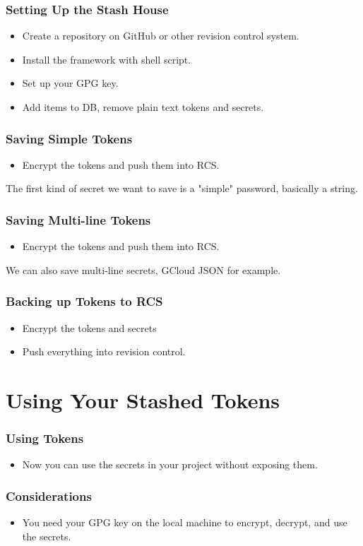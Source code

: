 \documentclass[aspectratio=169]{beamer}
\makeatletter
\def\sectionsubtitle#1{\gdef\@sectionsubtitle{#1}}
\gdef\@sectionsubtitle{}
\makeatother
\begin{document}
\begin{frame}
	\frametitle{Setting Up the Stash House}
	\begin{itemize}
		\item Create a repository on GitHub or other revision control system.
		\item Install the framework with shell script.
		\item Set up your GPG key.
		\item Add items to DB, remove plain text tokens and secrets.
	\end{itemize}
\end{frame}

\begin{frame}
	\frametitle{Saving Simple Tokens}
	\begin{itemize}
		\item Encrypt the tokens and push them into RCS.
	\end{itemize}
    \note[item]The first kind of secret we want to save is a "simple" password, basically a string.
\end{frame}

\begin{frame}
	\frametitle{Saving Multi-line Tokens}
	\begin{itemize}
		\item Encrypt the tokens and push them into RCS.
	\end{itemize}
    \note[item]We can also save multi-line secrets, GCloud JSON for example.
\end{frame}

\begin{frame}
	\frametitle{Backing up Tokens to RCS}
	\begin{itemize}
		\item Encrypt the tokens and secrets
		\item Push everything into revision control.
	\end{itemize}
\end{frame}

\sectionsubtitle{How to Use What You Built}
\section{Using Your Stashed Tokens}

\begin{frame}
	\frametitle{Using Tokens}
	\begin{itemize}
		\item Now you can use the secrets in your project without exposing them.
	\end{itemize}
\end{frame}

\begin{frame}
	\frametitle{Considerations}
	\begin{itemize}
		\item You need your GPG key on the local machine to encrypt, decrypt, and use the secrets.
	\end{itemize}
\end{frame}
\end{document}
